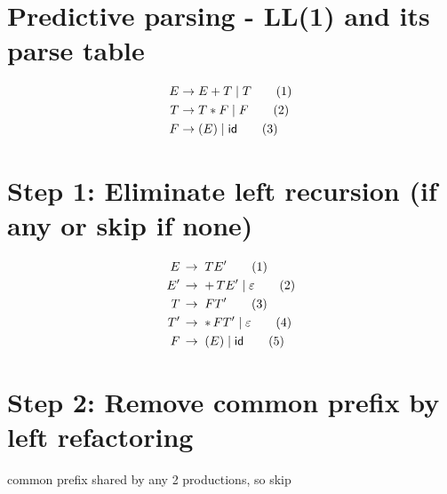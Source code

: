 \documentclass[10pt,a4paper,landscape]{article}
\begin{document}
\pagestyle{empty}
\begin{multicols*}{3}
\section*{Predictive parsing - LL(1) and its parse table}
\begin{align*}
  E \to\;& E + T \;|\; T         \tag{1} \\
  T \to\;& T * F \;|\; F         \tag{2} \\
  F \to\;& (E) \;|\; \mathsf{id} \tag{3}
\end{align*}
\section*{Step 1: Eliminate left recursion (if any or skip if none)}
\begin{align*}
  E\,  & \to\; TE'                     \tag{1} \\
  E'\, & \to\; +\,TE' \;|\; \varepsilon \tag{2} \\
  T\,  & \to\; FT'                     \tag{3} \\
  T'\, & \to\; *\,FT' \;|\; \varepsilon \tag{4} \\
  F\,  & \to\; (E)    \;|\; \mathsf{id} \tag{5}
\end{align*}
\section*{Step 2: Remove common prefix by left refactoring}
 common prefix shared by any 2 productions, so skip


\end{multicols*}
\end{document}
